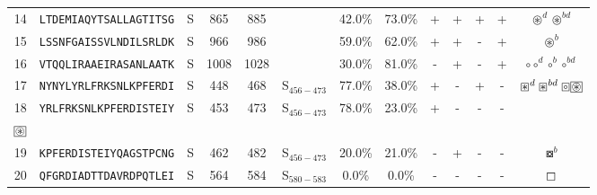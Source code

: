\begin{tabular}{rcccccccccccc}
14 &  \texttt{LTDEMIAQYTSALLAGTITSG} &       S &    865 &   885 &                &                          42.0\% &                           73.0\% &          + &           + &          + &           + &                                                                                                 $ \circledast^d \circledast^{bd} $ \\
15 &  \texttt{LSSNFGAISSVLNDILSRLDK} &       S &    966 &   986 &                &                          59.0\% &                           62.0\% &          + &           + &          - &           + &                                                                                                                  $ \circledast^b $ \\
16 &  \texttt{VTQQLIRAAEIRASANLAATK} &       S &   1008 &  1028 &                &                          30.0\% &                           81.0\% &          - &           + &          - &           + &                                                                                               $ \circ \circ^d \circ^b \circ^{bd} $ \\
17 &  \texttt{NYNYLYRLFRKSNLKPFERDI} &       S &    448 &   468 &  S$_{456-473}$ &                          77.0\% &                           38.0\% &          + &           - &          + &           - &                                              $ \boxast^d \boxast^{bd} \boxcircle \setlength{\fboxsep}{0.5pt} \boxed{\circledast} $ \\
18 &  \texttt{YRLFRKSNLKPFERDISTEIY} &       S &    453 &   473 &  S$_{456-473}$ &                          78.0\% &                           23.0\% &          + &           - &          - &           - &                    \Centerstack{  $\boxempty \boxast \boxast^b \boxcircle$ \\  $\setlength{\fboxsep}{0.5pt} \boxed{\circledast}$ } \\
19 &  \texttt{KPFERDISTEIYQAGSTPCNG} &       S &    462 &   482 &  S$_{456-473}$ &                          20.0\% &                           21.0\% &          - &           + &          - &           - &                                                                                                                   $ \boxcircle^b $ \\
20 &  \texttt{QFGRDIADTTDAVRDPQTLEI} &       S &    564 &   584 &  S$_{580-583}$ &                           0.0\% &                            0.0\% &          - &           - &          - &           - &                                                                                                                      $ \boxempty $ \\

\end{tabular}
